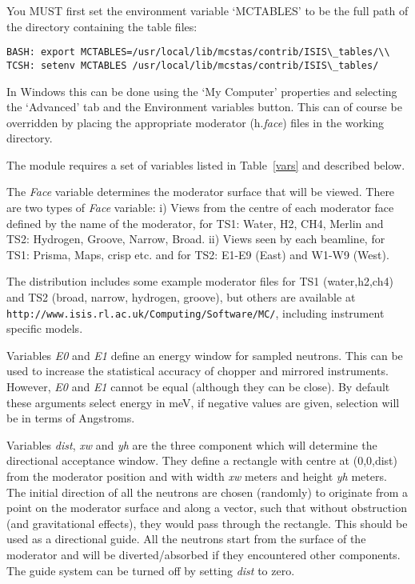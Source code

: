 You MUST first set the environment variable `MCTABLES' to be the
full path of the directory containing the table files:
\begin{verbatim}
BASH: export MCTABLES=/usr/local/lib/mcstas/contrib/ISIS\_tables/\\
TCSH: setenv MCTABLES /usr/local/lib/mcstas/contrib/ISIS\_tables/
\end{verbatim}
In Windows this can be done using the `My Computer' properties and
selecting the `Advanced' tab and the Environment variables button.
This can of course be overridden by placing the appropriate moderator (h.{\it{face}}) files in the
working directory.

The module requires a set of variables
listed in Table~\ref{vars} and described below.

The {\it Face} variable determines the moderator surface that will
be viewed. There are two types of {\it Face} variable: i)  Views
from the centre of each moderator face defined by the name of the
moderator, for TS1: Water, H2, CH4, Merlin and TS2: Hydrogen,
Groove, Narrow, Broad. ii) Views seen by each beamline, for TS1:
Prisma, Maps, crisp etc. and for TS2: E1-E9 (East) and W1-W9
(West).

The \MCS distribution includes some example moderator files for TS1 (water,h2,ch4) and TS2 (broad, narrow, hydrogen, groove), but others are available at \\ \verb+http://www.isis.rl.ac.uk/Computing/Software/MC/+, including instrument specific models.



Variables {\it E0} and {\it E1} define an energy window for sampled neutrons.
This can be used to increase the statistical
accuracy of chopper and mirrored instruments. However, {\it E0} and
{\it E1} cannot be equal (although they can be close). By default these arguments
select energy in meV, if negative values are given, selection will be in terms of Angstroms.

Variables {\it dist}, {\it xw} and {\it yh} are the three
component which will determine the directional acceptance window.
They define a rectangle with centre at (0,0,dist) from the
moderator position and with width {\it xw} meters and height {\it yh} meters.
The initial direction of all the neutrons are chosen (randomly) to
originate from a point on the moderator surface and along a
vector, such that without obstruction (and gravitational effects),
they would pass through the rectangle. This should be used as a
directional guide. All the neutrons start from the surface of the
moderator and will be diverted/absorbed if they encountered other
components. The guide system can be turned off by setting {\it
dist} to zero.

